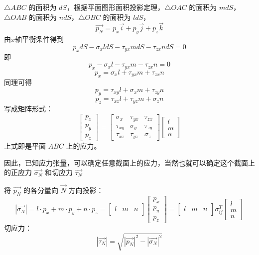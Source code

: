\documentclass[12pt,a4paper]{article}
\begin{document}
$\triangle ABC$ 的面积为 $dS$，根据平面图形面积投影定理，$\triangle OAC$ 的面积为 $mdS$，$\triangle OAB$ 的面积为 $ndS$，$\triangle OBC$ 的面积为 $ldS$，
$$
\overrightarrow{p_N}=p_x \overrightarrow{i} +p_y \overrightarrow{j} +p_z \overrightarrow{k}
$$
由$x$轴平衡条件得到
$$
p_x dS-\sigma_x l dS-\tau_{yx}mdS-\tau_{zx}ndS=0
$$
即
$$
p_x -\sigma_x l -\tau_{yx}m-\tau_{zx}n=0
$$
$$
p_x =\sigma_x l +\tau_{yx}m+\tau_{zx}n
$$
同理可得
$$
p_y =\tau_{xy} l +\sigma_x m +\tau_{zy}n
$$
$$
p_z =\tau_{xz} l +\tau_{yz}m + \sigma_z n
$$
写成矩阵形式：
$$
\begin{bmatrix}
p_x \\
p_y \\
p_z
\end{bmatrix}=
\begin{bmatrix}
\sigma _x & \tau_{yx} & \tau_{zx} \\
\tau_{xy} & \sigma _y & \tau_{zy} \\
\tau_{xz} & \tau_{yz} & \sigma _z
\end{bmatrix}
\begin{bmatrix}
l \\
m \\
n
\end{bmatrix}
$$
上式即是平面 $ABC$ 上的应力。

因此，已知应力张量，可以确定任意截面上的应力，当然也就可以确定这个截面上的正应力 $\overrightarrow{\sigma _N}$ 和切应力 $\overrightarrow{\tau_N}$

将 $\overrightarrow{p_N}$ 的各分量向 $\overrightarrow{N}$ 方向投影：
$$
\left|\overrightarrow{\sigma _N}\right|=l\cdot p_x + m\cdot p_y + n\cdot p_z=
\begin{bmatrix}
l & m & n\\
\end{bmatrix}
\begin{bmatrix}
p_x \\
p_y \\
p_z
\end{bmatrix}=
\begin{bmatrix}
l & m & n\\
\end{bmatrix}\sigma _{ij}^T
\begin{bmatrix}
l \\
m \\
n
\end{bmatrix}
$$
切应力：
$$
\left|\overrightarrow{\tau_N}\right|=\sqrt{|\overrightarrow{p_N}|^2-|\overrightarrow{\sigma _N}|^2}
$$
\end{document}
